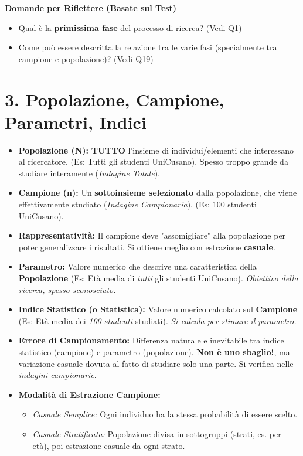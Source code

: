 \documentclass[12pt, a4paper]{article}
\newenvironment{reflectionbox}{%
    \begin{framed}\par\medskip\noindent
    \textbf{\color{boxtitlecolor}Domande per Riflettere (Basate sul Test)} \par
    \begin{itemize}[leftmargin=*, label=$\blacktriangleright$]
}{%
    \end{itemize}\par\medskip
    \end{framed}
}
\begin{document}
\begin{reflectionbox}
    \item Qual è la \textbf{primissima fase} del processo di ricerca? (Vedi Q1)
    \item Come può essere descritta la relazione tra le varie fasi (specialmente tra campione e popolazione)? (Vedi Q19)
\end{reflectionbox}

\section*{3. Popolazione, Campione, Parametri, Indici}
\begin{itemize}
    \item \textbf{Popolazione (N):} \textbf{TUTTO} l'insieme di individui/elementi che interessano al ricercatore. (Es: Tutti gli studenti UniCusano). Spesso troppo grande da studiare interamente (\textit{Indagine Totale}).
    \item \textbf{Campione (n):} Un \textbf{sottoinsieme selezionato} dalla popolazione, che viene effettivamente studiato (\textit{Indagine Campionaria}). (Es: 100 studenti UniCusano).
    \item \textbf{Rappresentatività:} Il campione deve "assomigliare" alla popolazione per poter generalizzare i risultati. Si ottiene meglio con estrazione \textbf{casuale}.
    \item \textbf{Parametro:} Valore numerico che descrive una caratteristica della \textbf{Popolazione} (Es: Età media di \textit{tutti} gli studenti UniCusano). \textit{Obiettivo della ricerca, spesso sconosciuto.}
    \item \textbf{Indice Statistico (o Statistica):} Valore numerico calcolato sul \textbf{Campione} (Es: Età media dei \textit{100 studenti} studiati). \textit{Si calcola per stimare il parametro.}
    \item \textbf{Errore di Campionamento:} Differenza naturale e inevitabile tra indice statistico (campione) e parametro (popolazione). \textbf{Non è uno sbaglio!}, ma variazione casuale dovuta al fatto di studiare solo una parte. Si verifica nelle \textit{indagini campionarie}.
    \item \textbf{Modalità di Estrazione Campione:}
        \begin{itemize}
            \item \textit{Casuale Semplice:} Ogni individuo ha la stessa probabilità di essere scelto.
            \item \textit{Casuale Stratificata:} Popolazione divisa in sottogruppi (strati, es. per età), poi estrazione casuale da ogni strato.
        \end{itemize}
\end{itemize}
\end{document}
